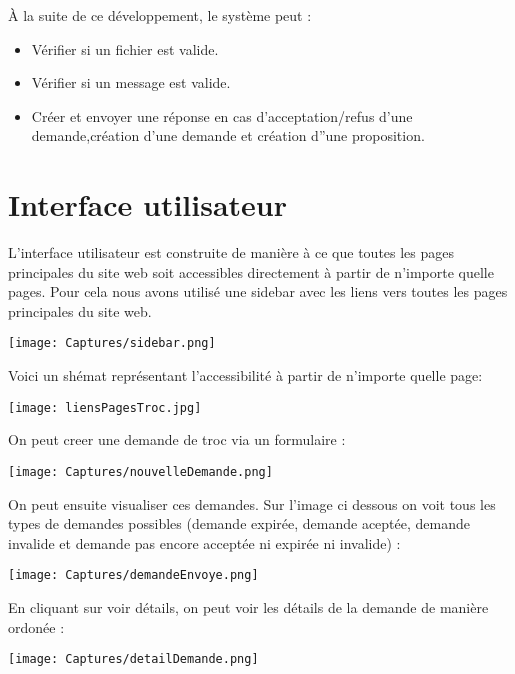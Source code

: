 \documentclass{article}
\begin{document}
À la suite de ce développement, le système peut :
\begin{itemize}
  \item Vérifier si un fichier est valide.
  \item Vérifier si un message est valide.
  \item Créer et envoyer une réponse en cas d'acceptation/refus d'une demande,création d'une demande et création d''une proposition.
\end{itemize}

\section{Interface utilisateur}
L'interface utilisateur est construite de manière à ce que toutes les pages principales du site web soit accessibles directement à partir de n'importe quelle pages. Pour cela nous avons utilisé une sidebar avec les liens vers toutes les pages principales du site web.

\begin{center}
\texttt{[image: Captures/sidebar.png]}
\end{center}

Voici un shémat représentant l'accessibilité à partir de n'importe quelle page:

\begin{center}
\texttt{[image: liensPagesTroc.jpg]}
\end{center}


On peut creer une demande de troc via un formulaire :

\begin{center}
\texttt{[image: Captures/nouvelleDemande.png]}
\end{center}

On peut ensuite visualiser ces demandes. Sur l'image ci dessous on voit tous les types de demandes possibles (demande expirée, demande aceptée, demande invalide et demande pas encore acceptée ni expirée ni invalide) :

\begin{center}
\texttt{[image: Captures/demandeEnvoye.png]}
\end{center}

En cliquant sur voir détails, on peut voir les détails de la demande de manière ordonée :

\begin{center}
\texttt{[image: Captures/detailDemande.png]}
\end{center}
\end{document}
